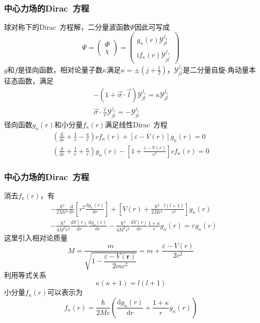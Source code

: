 {\frame
{
	\frametitle{中心力场的\textrm{Dirac~}方程}
	球对称下的\textrm{Dirac~}方程解，二分量波函数$\Psi$因此可写成
	\begin{displaymath}
		\Psi=\left( 
		\begin{matrix}
			\Phi\\
			\chi
		\end{matrix}
		\right)=\left( 
		\begin{matrix}
			g_{\kappa}(r)\mathcal{Y}_{jl}^{j_z}\\
			\mathrm{i}f_{\kappa}(r)\mathcal{Y}_{jl^{\prime}}^{j_z}
		\end{matrix}
		\right)
	\end{displaymath}
	$g$和$f$是径向函数，相对论量子数$\kappa$满足$\kappa=\pm(j+\frac12)$，$\mathcal{Y}_{jl}^{j_z}$是二分量自旋-角动量本征态函数，满足
	\begin{displaymath}
		\begin{aligned}
			-(1+\vec{\sigma}\cdot\vec l)\mathcal{Y}_{jl}^{j_z}=\kappa\mathcal{Y}_{jl}^{j_z}\\
			\vec{\sigma}\cdot\frac{\vec r}r\mathcal{Y}_{jl}^{j_z}=-\mathcal{Y}_{jl}^{j_z}
		\end{aligned}
	\end{displaymath}
	径向函数$g_{\kappa}(r)$和小分量$f_{\kappa}(r)$满足线性\textrm{Dirac~}方程
	\begin{displaymath}
		\begin{aligned}
			\left( \frac{\mathrm{d}}{\mathrm{d}r}+\frac1r-\frac{\kappa}r \right)cf_{\kappa}(r)+[\varepsilon-V(r)]g_{\kappa}(r)=0\\
			\left( \frac{\mathrm{d}}{\mathrm{d}r}+\frac1r+\frac{\kappa}r \right)g_{\kappa}(r)-\left[ 1+\frac{\varepsilon-V(r)}{c^2} \right]cf_{\kappa}(r)=0
		\end{aligned}
	\end{displaymath}
}

\frame
{
	\frametitle{中心力场的\textrm{Dirac~}方程}
	消去$f_{\kappa}(r)$，有
	\begin{displaymath}
		\begin{aligned}
			&-\frac{\hbar^2}{2Mr^2}\frac{\mathrm{d}}{\mathrm{d}r}\left[ r^2\frac{\mathrm{d}g_{\kappa}(r)}{\mathrm{d}r} \right]+\left[ V(r)+\frac{\hbar^2}{2Mr^2}\frac{l(l+1)}{r^2} \right]g_{\kappa}(r)\\
			&-\frac{\hbar^2}{4M^2c^2}\frac{\mathrm{d}V(r)}{\mathrm{d}r}\frac{\mathrm{d}g_{\kappa}(r)}{\mathrm{d}r}-\frac{\hbar^2}{4M^2c^2}\frac{\mathrm{d}V(r)}{\mathrm{d}r}\frac{1+\kappa}rg_{\kappa}(r)=\varepsilon g_{\kappa}(r)
		\end{aligned}
	\end{displaymath}
	这里引入相对论质量$$M=\dfrac{m}{\sqrt{1-\dfrac{\varepsilon-V(\mathbf{r})}{2mc^2}}}=m+\frac{\varepsilon-V(r)}{2c^2}$$
	利用等式关系$$\kappa(\kappa+1)=l(l+1)$$
	小分量$f_{\kappa}(r)$可以表示为
	\begin{displaymath}
		f_{\kappa}(r)=\frac{\hbar}{2Mc}\left( \frac{\mathrm{d}g_{\kappa}(r)}{\mathrm{d}r}+\frac{1+\kappa}rg_{\kappa}(r) \right)
	\end{displaymath}
}

}
